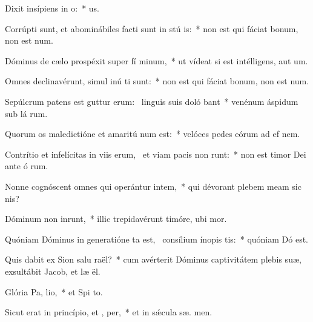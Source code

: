 \item Dixit insípiens in  o:~*   us.
\item Corrúpti sunt, et abominábiles facti sunt in stú is:~* non est qui fáciat bonum, non est   num.
\item Dóminus de cælo prospéxit super fí minum,~* ut vídeat si est intélligens, aut  um.
\item Omnes declinavérunt, simul inú ti sunt:~* non est qui fáciat bonum, non est   num.
\item Sepúlcrum patens est guttur erum:~\pscross{} linguis suis doló bant~* venénum áspidum sub lá rum.
\item Quorum os maledictióne et amaritú num est:~* velóces pedes eórum ad ef nem.
\item Contrítio et infelícitas in viis erum,~\pscross{} et viam pacis non runt:~* non est timor Dei ante ó rum.
\item Nonne cognóscent omnes qui operántur intem,~* qui dévorant plebem meam sic  nis?
\item Dóminum non inrunt,~* illic trepidavérunt timóre, ubi   mor.
\item Quóniam Dóminus in generatióne ta est,~\pscross{} consílium ínopis tis:~* quóniam Dó   est.
\item Quis dabit ex Sion salu raël?~* cum avérterit Dóminus captivitátem plebis suæ, exsultábit Jacob, et læ ël.
\item Glória Pa,  lio,~* et Spi to.
\item Sicut erat in princípio, et ,  per,~* et in sǽcula sæ. men.
